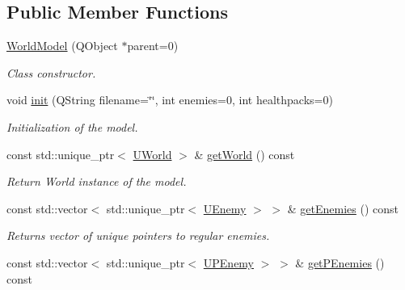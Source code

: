 \subsection*{Public Member Functions}
\begin{DoxyCompactItemize}
\item 
\hyperlink{classWorldModel_a6787b97a5c8826279e9a31740819f277}{World\+Model} (Q\+Object $\ast$parent=0)
\begin{DoxyCompactList}\small\item\em Class constructor. \end{DoxyCompactList}\item 
void \hyperlink{classWorldModel_a9003814b10d3b533d3c4313613712493}{init} (Q\+String filename=\char`\"{}\char`\"{}, int enemies=0, int healthpacks=0)
\begin{DoxyCompactList}\small\item\em Initialization of the model. \end{DoxyCompactList}\item 
const std\+::unique\+\_\+ptr$<$ \hyperlink{classUWorld}{U\+World} $>$ \& \hyperlink{classWorldModel_a0b50ae0247e6c6553ab39f47e4dd54ca}{get\+World} () const \hypertarget{classWorldModel_a0b50ae0247e6c6553ab39f47e4dd54ca}{}\label{classWorldModel_a0b50ae0247e6c6553ab39f47e4dd54ca}

\begin{DoxyCompactList}\small\item\em Return World instance of the model. \end{DoxyCompactList}\item 
const std\+::vector$<$ std\+::unique\+\_\+ptr$<$ \hyperlink{classUEnemy}{U\+Enemy} $>$ $>$ \& \hyperlink{classWorldModel_ad14d1117ade3ef9fbc16c0384c505e82}{get\+Enemies} () const \hypertarget{classWorldModel_ad14d1117ade3ef9fbc16c0384c505e82}{}\label{classWorldModel_ad14d1117ade3ef9fbc16c0384c505e82}

\begin{DoxyCompactList}\small\item\em Returns vector of unique pointers to regular enemies. \end{DoxyCompactList}\item 
const std\+::vector$<$ std\+::unique\+\_\+ptr$<$ \hyperlink{classUPEnemy}{U\+P\+Enemy} $>$ $>$ \& \hyperlink{classWorldModel_a3a573fb0a631baa1b7eb788748181bb7}{get\+P\+Enemies} () const \hypertarget{classWorldModel_a3a573fb0a631baa1b7eb788748181bb7}{}\label{classWorldModel_a3a573fb0a631baa1b7eb788748181bb7}


\end{DoxyCompactItemize}
